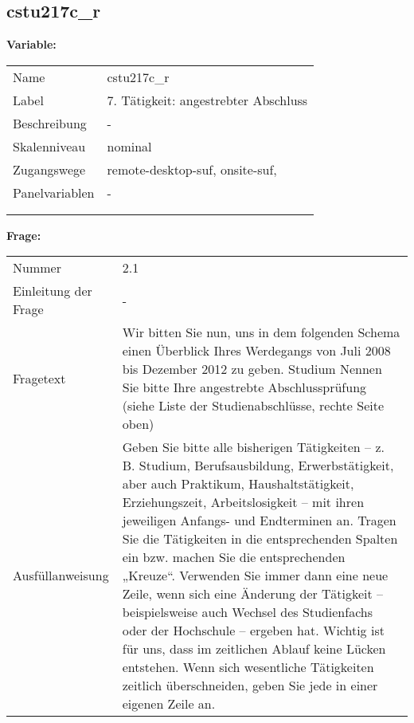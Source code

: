 	
	
	\subsection{cstu217c\_r}
	\label{subSection:cstu217c_r}

	\noindent\textbf{Variable:}\\
		\begin{tabular}{lL{11.3cm}}
			\label{tableVariable:cstu217c_r}
			Name & cstu217c\_r \\
			Label & 7. Tätigkeit: angestrebter Abschluss \\
			Beschreibung & - \\
			Skalenniveau & nominal \\
			Zugangswege &
				remote-desktop-suf,
				onsite-suf,
 \\
			Panelvariablen & -
			 \\
			 \\
 \\
		\end{tabular}

		\vspace*{1 cm}
		\noindent\textbf{Frage:}\\
		\begin{tabular}{lL{11.3cm}}
			\label{tableQuestion:cstu217c_r}
			Nummer & 2.1 \\
			Einleitung der Frage & - \\
			Fragetext & Wir bitten Sie nun, uns in dem folgenden Schema einen Überblick Ihres Werdegangs von Juli 2008 bis Dezember 2012 zu geben.
Studium
Nennen Sie bitte Ihre angestrebte Abschlussprüfung 
(siehe Liste der Studienabschlüsse, rechte Seite oben) \\
			Ausfüllanweisung & Geben Sie bitte alle bisherigen Tätigkeiten – z. B. Studium, Berufsausbildung, Erwerbstätigkeit, aber auch Praktikum, Haushaltstätigkeit,
Erziehungszeit, Arbeitslosigkeit – mit ihren jeweiligen Anfangs- und Endterminen an. Tragen Sie die Tätigkeiten in die entsprechenden Spalten ein bzw. machen Sie die entsprechenden „Kreuze“. Verwenden Sie immer dann eine neue Zeile, wenn sich eine Änderung der Tätigkeit – beispielsweise auch Wechsel des Studienfachs oder der Hochschule – ergeben hat. Wichtig ist für uns, dass im zeitlichen Ablauf keine Lücken entstehen. Wenn sich wesentliche Tätigkeiten zeitlich überschneiden, geben Sie jede in einer eigenen Zeile an. \\
		\end{tabular}





